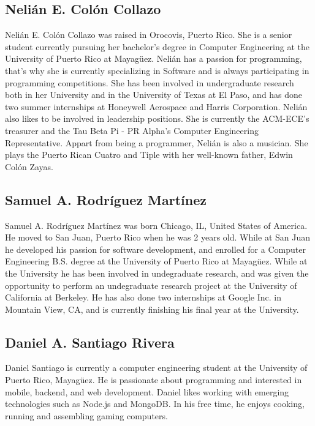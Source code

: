 \label{sec:bios}

\subsection{Nelián E. Colón Collazo}
Nelián E. Colón Collazo was raised in Orocovis, Puerto Rico. She is a senior student currently pursuing her bachelor's degree in Computer Engineering at the University of Puerto Rico at Mayagüez. Nelián has a passion for programming, that's why she is currently specializing in Software and is always participating in programming competitions. She has been involved in undergraduate research both in her University and in the University of Texas at El Paso, and has done two summer internships at Honeywell Aerospace and Harris Corporation. Nelián also likes to be involved in leadership positions. She is currently the ACM-ECE's treasurer and the Tau Beta Pi - PR Alpha's Computer Engineering Representative. Appart from being a programmer, Nelián is also a musician. She plays the Puerto Rican Cuatro and Tiple with her well-known father, Edwin Colón Zayas. 

\subsection{Samuel A. Rodríguez Martínez}
Samuel A. Rodríguez Martínez was born Chicago, IL, United States of America. He moved to San Juan,
Puerto Rico when he was 2 years old. While at San Juan he developed his passion for software
development, and enrolled for a Computer Engineering B.S. degree at the University of Puerto Rico at
Mayagüez. While at the University he has been involved in undegraduate research, and was given the
opportunity to perform an undegraduate research project at the University of California at Berkeley.
He has also done two internships at Google Inc. in Mountain View, CA, and is currently finishing his
final year at the University.

\subsection{Daniel A. Santiago Rivera}
Daniel Santiago is currently a computer engineering student at the University of Puerto Rico, Mayagüez. He is passionate about programming and interested in mobile, backend, and web development. Daniel likes working with emerging technologies such as Node.js and MongoDB. In his free time, he enjoys cooking, running and assembling gaming computers.
